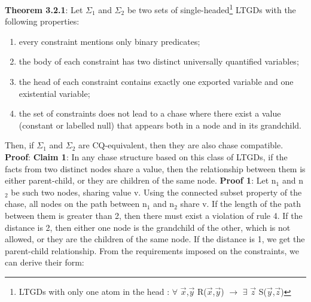 \documentclass[11pt, a4paper, dvipsnames]{article}
\begin{document}
\textbf{Theorem 3.2.1}: Let $\Sigma_{1}$ and $\Sigma_{2}$ be two sets of single-headed\footnote{LTGDs with only one atom in the head : $\forall$ $\vec{x}$,$\vec{y}$ R($\vec{x}$,$\vec{y}$) $\rightarrow$ $\exists$ $\vec{z}$ S($\vec{y}$,$\vec{z}$)} LTGDs with the following properties:
\begin{enumerate}
	\item every constraint mentions only binary predicates;
	\item the body of each constraint has two distinct universally quantified variables;
	\item the head of each constraint contains exactly one exported variable and one existential variable;
	\item the set of constraints does not lead to a chase where there exist a value (constant or labelled null) that appears both in a node and in its grandchild.
\end{enumerate}
Then, if $\Sigma_{1}$ and $\Sigma_{2}$ are CQ-equivalent, then they are also chase compatible.\newline
\textbf{Proof}: \newline
\textbf{Claim 1}: In any chase structure based on this class of LTGDs, if the facts from two distinct nodes share a value, then the relationship between them is either parent-child, or they are children of the same node.\newline
\textbf{Proof 1}: Let n$_{1}$ and n$_{2}$ be such two nodes, sharing value v. Using the connected subset property of the chase, all nodes on the path between n$_{1}$ and n$_{2}$ share v. If the length of the path between them is greater than 2, then there must exist a violation of rule 4. If the distance is 2, then either one node is the grandchild of the other, which is not allowed, or they are the children of the same node. If the distance is 1, we get the parent-child relationship.\newline
From the requirements imposed on the constraints, we can derive their form:
\end{document}
